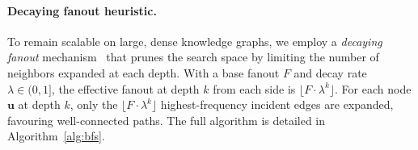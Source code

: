 \vspace{-1em}
\paragraph{Decaying fanout heuristic.}
To remain scalable on large, dense knowledge graphs, we employ a \emph{decaying fanout}
mechanism~\cite{nam2025sequential} that prunes the search space by limiting the number of
neighbors expanded at each depth.  With a base fanout $F$ and decay rate $\lambda \in (0, 1]$,
the effective fanout at depth $k$ from each side is $\lfloor F \cdot \lambda^{k} \rfloor$.
For each node $\mathbf{u}$ at depth $k$, only the $\lfloor F \cdot \lambda^{k} \rfloor$
highest-frequency incident edges are expanded, favouring well-connected paths.  The full
algorithm is detailed in Algorithm~\ref{alg:bfs}.

